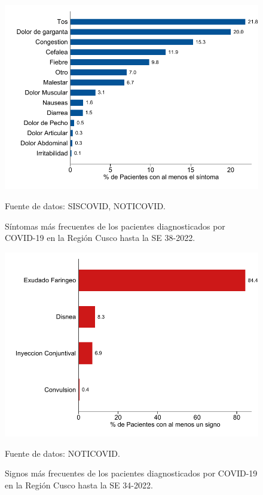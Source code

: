 \documentclass[12pt,a4paper,openany]{book}
\begin{document}
	 
	
	\begin{figure}[h]
		\caption{Síntomas más frecuentes de los pacientes diagnosticados por COVID-19 en la Región Cusco hasta la SE 38-2022.  }\label{fig:sintomas}
		\begin{center}
			\includegraphics[width=0.85\linewidth]{../figuras/figura_sintoma.pdf}
		\end{center}
		{\footnotesize {Fuente de datos: SISCOVID, NOTICOVID.}}
	\end{figure}
	
	\begin{figure}[h]
		\caption{Signos más frecuentes de los pacientes diagnosticados por COVID-19 en la Región Cusco hasta la SE 34-2022.}\label{fig:signos}
		\begin{center}
			\includegraphics[width=0.65\linewidth]{../figuras/figura_signo.pdf}
		\end{center}
		{\footnotesize {Fuente de datos: NOTICOVID.}}
	\end{figure}
	
	
	  
\end{document}
